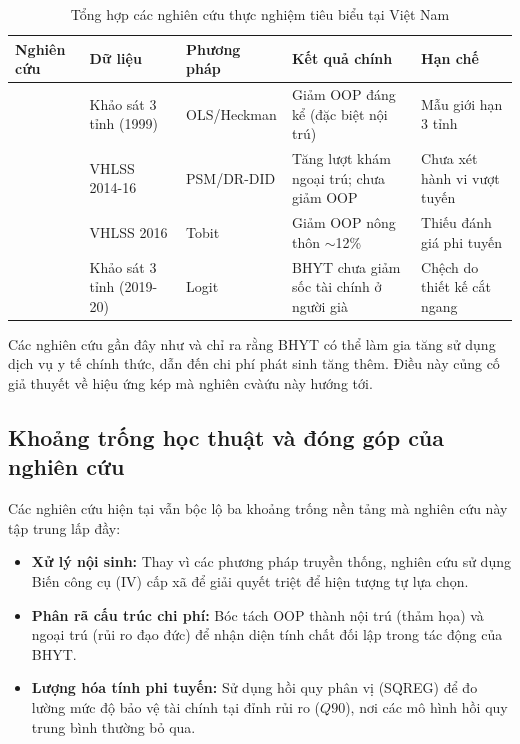 \documentclass[12pt,a4paper]{article}
\begin{document}
\begin{table}[htbp]
	\centering
	\small
	\caption{Tổng hợp các nghiên cứu thực nghiệm tiêu biểu tại Việt Nam}
	\label{tab:litreview}
	\begin{tabular}{p{2.5cm}p{2.2cm}p{2.2cm}p{4cm}p{3cm}}
		\toprule
		\textbf{Nghiên cứu} & \textbf{Dữ liệu} & \textbf{Phương pháp} & \textbf{Kết quả chính} & \textbf{Hạn chế} \\
		\midrule
		\textcite{jowett2003} & Khảo sát 3 tỉnh (1999) & OLS/Heckman & Giảm OOP đáng kể (đặc biệt nội trú) & Mẫu giới hạn 3 tỉnh \\
		\textcite{thuong2020} \textcite{nguyen2023bmc} & VHLSS 2014-16 & PSM/DR-DID & Tăng lượt khám ngoại trú; chưa giảm OOP & Chưa xét hành vi vượt tuyến \\
		\textcite{lee2019ijerph} & VHLSS 2016 & Tobit & Giảm OOP nông thôn $\sim$12\% & Thiếu đánh giá phi tuyến \\
		\textcite{giang2022} & Khảo sát 3 tỉnh (2019-20) & Logit & BHYT chưa giảm sốc tài chính ở người già & Chệch do thiết kế cắt ngang \\
		\bottomrule
	\end{tabular}
\end{table}

Các nghiên cứu gần đây như \textcite{thuong2020} và \textcite{nguyen2023bmc} chỉ ra rằng BHYT có thể làm gia tăng sử dụng dịch vụ y tế chính thức, dẫn đến chi phí phát sinh tăng thêm. Điều này củng cố giả thuyết về hiệu ứng kép mà nghiên cvàứu này hướng tới.

\subsection{Khoảng trống học thuật và đóng góp của nghiên cứu}

Các nghiên cứu hiện tại vẫn bộc lộ ba khoảng trống nền tảng mà nghiên cứu này tập trung lấp đầy:

\begin{itemize}
	\item \textbf{Xử lý nội sinh:} Thay vì các phương pháp truyền thống, nghiên cứu sử dụng Biến công cụ (IV) cấp xã để giải quyết triệt để hiện tượng tự lựa chọn.
	\item \textbf{Phân rã cấu trúc chi phí:} Bóc tách OOP thành nội trú (thảm họa) và ngoại trú (rủi ro đạo đức) để nhận diện tính chất đối lập trong tác động của BHYT.
	\item \textbf{Lượng hóa tính phi tuyến:} Sử dụng hồi quy phân vị (SQREG) để đo lường mức độ bảo vệ tài chính tại đỉnh rủi ro ($Q90$), nơi các mô hình hồi quy trung bình thường bỏ qua.
\end{itemize}
\end{document}
